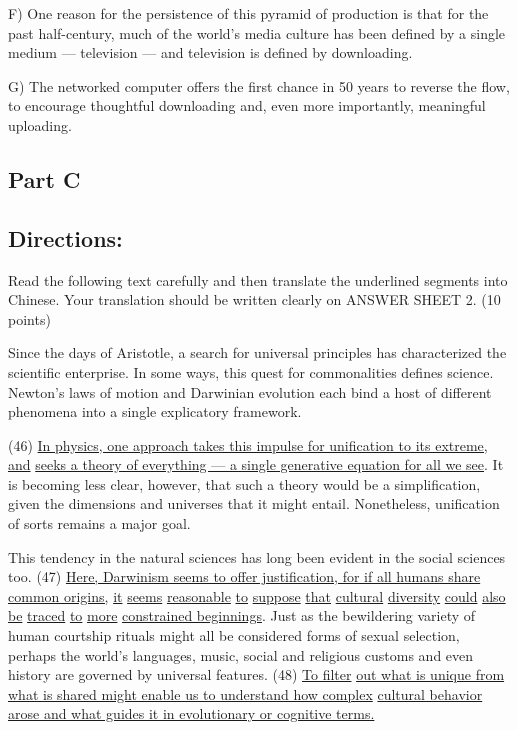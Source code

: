 \documentclass[UTF8,11pt]{ctexart}
\begin{document}
F) One reason for the persistence of this pyramid of production is that for the past half-century, much of the world’s media culture has been defined by a single medium — television — and television is defined by downloading.


G) The networked computer offers the first chance in 50 years to reverse the flow, to encourage thoughtful downloading and, even more importantly, meaningful uploading.


\subsection*{\textbf{Part C}}


\subsection*{\textbf{Directions:}}


Read the following text carefully and then translate the underlined segments into Chinese. Your translation should be written clearly on ANSWER SHEET 2. (10 points)


Since the days of Aristotle, a search for universal principles has characterized the scientific enterprise. In some ways, this quest for commonalities defines science. Newton’s laws of motion and Darwinian evolution each bind a host of different phenomena into a single explicatory framework.


(46) \uline{In physics, one approach takes this impulse for unification to its extreme, and} \uline{seeks a theory of everything — a single generative equation for all we see}. It is becoming less clear, however, that such a theory would be a simplification, given the dimensions and universes that it might entail. Nonetheless, unification of sorts remains a major goal.


This tendency in the natural sciences has long been evident in the social sciences too. (47) \uline{Here, Darwinism seems to offer justification, for if all humans share common origins,} \uline{it} \uline{seems} \uline{reasonable} \uline{to} \uline{suppose} \uline{that} \uline{cultural} \uline{diversity} \uline{could} \uline{also} \uline{be} \uline{traced} \uline{to} \uline{more} \uline{constrained beginnings}. Just as the bewildering variety of human courtship rituals might all be considered forms of sexual selection, perhaps the world’s languages, music, social and religious customs and even history are governed by universal features. (48) \uline{To filter} \uline{out what is unique from what is shared might enable us to understand how complex} \uline{cultural behavior arose and what guides it in evolutionary or cognitive terms.}
\end{document}
